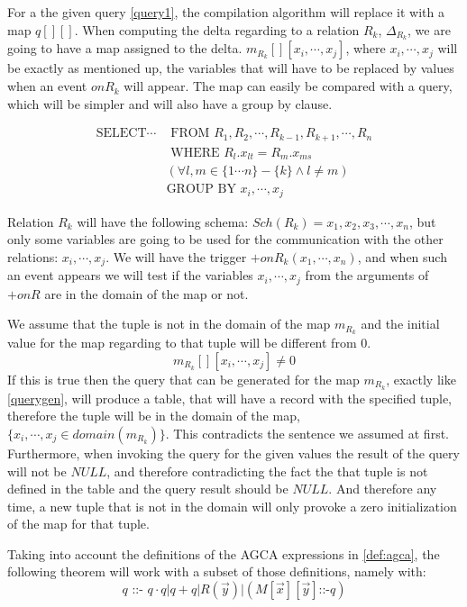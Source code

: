 \documentclass[12pt]{article}
\begin{document}
For a the given query \ref{query1}, the compilation algorithm will replace it with a map $q[][]$. When computing the delta regarding to a relation $R_k$, $\Delta_{R_k}$, we are going to have a map assigned to the delta. $m_{R_k}[][x_i,\cdots,x_j]$, where $x_i,\cdots,x_j$ will be exactly as mentioned up, the variables that will have to be replaced by values when an event $onR_k$ will appear. The map can easily be compared with a query, which will be simpler and will also have a group by clause.

\begin{align}
\text{SELECT}\cdots&\text{ FROM }R_1,R_2,\cdots,R_{k-1},R_{k+1},\cdots,R_n\label{querygen}\\
&\text{ WHERE }R_l.x_{lt}=R_m.x_{ms}\nonumber\\
&(\forall l,m\in\{1\cdots n\}-\{k\}\land l\not=m)\nonumber\\
&\text{GROUP BY } x_i,\cdots,x_j\nonumber
\end{align}
	
Relation $R_k$ will have the following schema: $Sch(R_k)={x_1,x_2,x_3,\cdots,x_n}$, but only some variables are going to be used for the communication with the other relations: $x_i,\cdots,x_j$. We will have the trigger $+onR_k(x_1,\cdots,x_n)$, and when such an event appears we will test if the variables $x_i,\cdots,x_j$ from the arguments of $+onR$ are in the domain of the map or not. 
	
We assume that the tuple is not in the domain of the map $m_{R_k}$ and the initial value for the map regarding to that tuple will be different from 0.
$$m_{R_k}[][x_i,\cdots,x_j]\not= 0$$
If this is true then the query that can be generated for the map $m_{R_k}$, exactly like \ref{querygen},
will produce a table, that will have a record with the specified tuple, therefore the tuple will be in the domain of the map, $\{x_i,\cdots,x_j\in domain(m_{R_k}) \}$. This contradicts the sentence we assumed at first. Furthermore, when invoking the query for the given values the result of the query will not be $NULL$, and therefore contradicting the fact the that tuple is not defined in the table and the query result should be $NULL$. And therefore any time, a new tuple that is not in the domain will only provoke a zero initialization of the map for that tuple.

Taking into account the definitions of the AGCA expressions in \ref{def:agca}, the following theorem will work with a subset of those definitions, namely with:
$$q\text{ ::- }q\cdot q | q + q|R(\vec{y})|(M[\vec{x}][\vec{y}]\text{::-}q)$$
\end{document}
